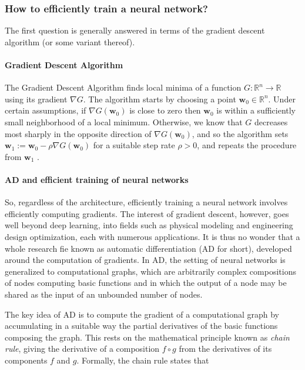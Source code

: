 \subsubsection{How to eﬃciently train a neural network?} The ﬁrst question is generally answered in terms of the gradient descent algorithm (or some variant thereof). 

\paragraph{Gradient Descent Algorithm} The Gradient Descent Algorithm ﬁnds local minima of a function $G : \mathbb{R}^n \rightarrow \mathbb{R}$ using its gradient $\nabla G$. The algorithm starts by choosing a point $\mathbf{w}_0 \in \mathbb{R}^n$. Under certain assumptions, if $\nabla G(\mathbf{w}_0)$ is close to zero then $\mathbf{w}_0$ is within a suﬃciently small neighborhood of a local minimum. Otherwise, we know that $G$ decreases most sharply in the opposite direction of $\nabla G(\mathbf{w}_0)$, and so the algorithm sets $\mathbf{w}_1 := \mathbf{w}_0 - \rho \nabla G(\mathbf{w}_0)$ for a suitable step rate $\rho >0$, and repeats the procedure from $\mathbf{w}_1$ .

\paragraph{AD and efficient training of neural networks} So, regardless of the architecture, eﬃciently training a neural network involves eﬃciently computing gradients. The interest of gradient descent, however, goes well beyond deep learning, into ﬁelds such as physical modeling and engineering design optimization, each with numerous applications. It is thus no wonder that a whole research ﬁe
known as automatic diﬀerentiation (AD for short), developed around the computation of gradients. In AD, the setting of neural networks is generalized to computational graphs, which are arbitrarily complex compositions of nodes computing basic functions and in which the output of a node may be shared as the input of an unbounded number of nodes.

The key idea of AD is to compute the gradient of a computational graph by accumulating in a suitable way the
partial derivatives of the basic functions composing the graph. This rests on the mathematical principle known as
\emph{chain rule}, giving the derivative of a composition $f \circ g$ from the derivatives of its components $f$ and $g$. Formally, the chain rule states that

